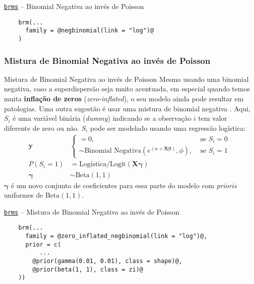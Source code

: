 \begin{frame}[fragile]{\href{https://paul-buerkner.github.io/brms/}{\texttt{brms}} -- Binomial Negativa ao invés de Poisson}
	\begin{lstlisting}
    brm(...
      family = @negbinomial(link = "log")@
    )
    \end{lstlisting}
\end{frame}

\subsubsection{Mistura de Binomial Negativa ao invés de Poisson}
\begin{frame}{Mistura de Binomial Negativa ao invés de Poisson}
	\small
	Mesmo usando uma binomial negativa, caso a superdispersão seja muito acentuada,
	em especial quando temos muita \textbf{inflação de zeros} (\textit{zero-inflated}),
	o seu modelo ainda pode resultar em patologias.
	Uma outra sugestão é usar uma mistura de binomial negativa \parencite{mcelreath2020statistical}.
	Aqui, $S_i$ é uma variável binária (\textit{dummy})
	indicando se a observação $i$ tem valor diferente de zero ou não.
	$S_i$ pode ser modelado usando uma regressão logística:
	$$
		\begin{aligned}
			\boldsymbol{y}
			                    & \begin{cases}
				                      = 0,                                                                                             & \text{ se } S_i = 0 \\
				                      \sim \text{Binomial Negativa} \left( e^{(\alpha + \mathbf{X} \boldsymbol{\beta})}, \phi \right), & \text{ se } S_i = 1
			                      \end{cases} \\
			P(S_i = 1)          & = \text{Logística/Logit}(\mathbf{X} \boldsymbol{\gamma})                                                               \\
			\boldsymbol{\gamma} & \sim \text{Beta}(1, 1)
		\end{aligned}
	$$
	\small
	$\boldsymbol{\gamma}$ é um novo conjunto de coeficientes para essa parte do modelo com
	\textit{prioris} uniformes de $\text{Beta} (1, 1)$.
\end{frame}

\begin{frame}[fragile]{\href{https://paul-buerkner.github.io/brms/}{\texttt{brms}} -- Mistura de Binomial Negativa ao invés de Poisson}
	\begin{lstlisting}
    brm(...
      family = @zero_inflated_negbinomial(link = "log")@,
      prior = c(
          ...
        @prior(gamma(0.01, 0.01), class = shape)@,
        @prior(beta(1, 1), class = zi)@
    ))
    \end{lstlisting}
\end{frame}

